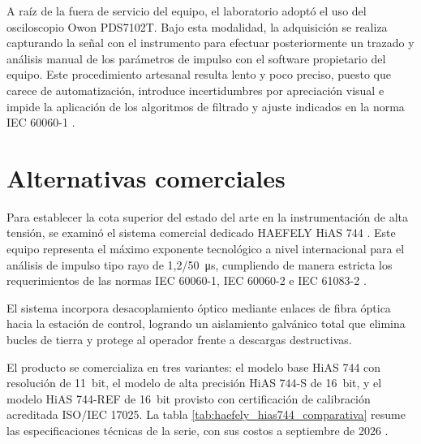A raíz de la fuera de servicio del equipo, el laboratorio adoptó el uso del osciloscopio Owon PDS7102T. Bajo esta modalidad, la adquisición se realiza capturando la señal con el instrumento para efectuar posteriormente un trazado y análisis manual de los parámetros de impulso con el software propietario del equipo. Este procedimiento artesanal resulta lento y poco preciso, puesto que carece de automatización, introduce incertidumbres por apreciación visual e impide la aplicación de los algoritmos de filtrado y ajuste indicados en la norma IEC 60060-1 \cite{iec60060_1}.

\section{Alternativas comerciales}
\label{sec:alternativas_comerciales}

Para establecer la cota superior del estado del arte en la instrumentación de alta tensión, se examinó el sistema comercial dedicado HAEFELY HiAS 744 \cite{haefely_brochure}. Este equipo representa el máximo exponente tecnológico a nivel internacional para el análisis de impulso tipo rayo de \qty[parse-numbers=false]{1,2/50}{\micro\second}, cumpliendo de manera estricta los requerimientos de las normas IEC 60060-1, IEC 60060-2 e IEC 61083-2 \cite{iec61083_2}.

El sistema incorpora desacoplamiento óptico mediante enlaces de fibra óptica hacia la estación de control, logrando un aislamiento galvánico total que elimina bucles de tierra y protege al operador frente a descargas destructivas.

El producto se comercializa en tres variantes: el modelo base HiAS 744 con resolución de \qty{11}{bit}, el modelo de alta precisión HiAS 744-S de \qty{16}{bit}, y el modelo HiAS 744-REF de \qty{16}{bit} provisto con certificación de calibración acreditada ISO/IEC 17025. La tabla \ref{tab:haefely_hias744_comparativa} resume las especificaciones técnicas de la serie, con sus costos a septiembre de 2026 \cite{haefely_datasheet}.


